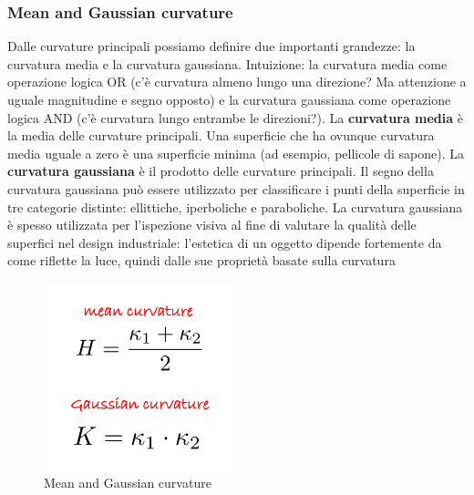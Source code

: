 \subsubsection{Mean and Gaussian curvature}
Dalle curvature principali possiamo definire due importanti grandezze: la curvatura media e la curvatura gaussiana.
Intuizione: la curvatura media come operazione logica OR (c'è curvatura almeno lungo una direzione? Ma attenzione a uguale magnitudine e segno opposto) e la curvatura gaussiana come operazione logica AND (c'è curvatura lungo entrambe le direzioni?).
La \textbf{curvatura media} è la media delle curvature principali. Una superficie che ha ovunque curvatura media uguale a zero è una superficie minima (ad esempio, pellicole di sapone).
La \textbf{curvatura gaussiana} è il prodotto delle curvature principali. Il segno della curvatura gaussiana può essere utilizzato per classificare i punti della superficie in tre categorie distinte: ellittiche, iperboliche e paraboliche.
La curvatura gaussiana è spesso utilizzata per l'ispezione visiva al fine di valutare la qualità delle superfici nel design industriale: l'estetica di un oggetto dipende fortemente da come riflette la luce, quindi dalle sue proprietà basate sulla curvatura
\begin{figure}[H]
    \centering
    \includegraphics[width=0.5\textwidth]{images/MeanGaussi.png} 
    \caption{Mean and Gaussian curvature}
    \label{fig:immagine}
\end{figure}
